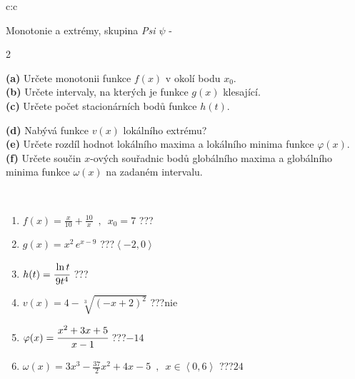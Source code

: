 \documentclass[10pt]{report}
\begin{document}
\newpage
\thispagestyle{empty}
\begin{tabular}{c:c}
\begin{minipage}[c][104.5mm][t]{0.5\linewidth}
\begin{center}
\vspace{7mm}
{\huge Monotonie a extrémy, skupina \textit{Psi $\psi$} -}\\[5mm]
\begin{minipage}{0.95\linewidth}
\begin{center}
{\small \begin{multicols}{2} \raggedright
\textbf{(a)} Určete monotonii funkce \(f(x)\) v okolí bodu \(x_0\). \\[1mm]
\textbf{(b)} Určete intervaly, na kterých je funkce \(g(x)\) klesající. \\[1mm]
\textbf{(c)} Určete počet stacionárních bodů funkce \(h(t)\). \par \columnbreak
\textbf{(d)} Nabývá funkce \(v(x)\) lokálního extrému? \\[1mm]
\textbf{(e)} Určete rozdíl hodnot lokálního maxima a lokálního minima funkce \(\varphi(x)\). \\[1mm]
\textbf{(f)} Určete součin \(x\)-ových souřadnic bodů globálního maxima a globálního minima funkce \(\omega(x)\) na zadaném intervalu. \\[1mm]
\end{multicols}
}
\end{center}
\end{minipage}
\\[4mm]
\begin{minipage}{0.79\linewidth}
\begin{center}
\begin{varwidth}{\linewidth}
\begin{enumerate}
\normalsize
\item $f(x)=\frac{x}{10}+\frac{10}{x} \enspace , \enspace x_0=7$\quad \dotfill\; ???\;\dotfill \quad {}
\item $g(x)=x^2\, e^{x-9}$\quad \dotfill\; ???\;\dotfill \quad $\left\langle-2 , 0\right\rangle$
\item $h(t)=\cfrac{\ln t}{9t^4}$\quad \dotfill\; ???\;\dotfill {}
\item $v(x)=4-\sqrt[3]{(-x+2)^2}$\quad \dotfill\; ???\;\dotfill \quad $\text{nie}$
\item $\varphi(x)=\cfrac{x^2+3x+5}{x-1}$\quad \dotfill\; ???\;\dotfill \quad $-14$
\item $\omega(x)=3x^3-\frac{37}{2}x^2+4x-5 \enspace , \enspace x\in\left\langle0 , 6\right\rangle$\quad \dotfill\; ???\;\dotfill \quad $24$

\end{enumerate}
\end{varwidth}
\end{center}
\end{minipage}
\end{center}
\end{minipage}
\end{tabular}
\end{document}
